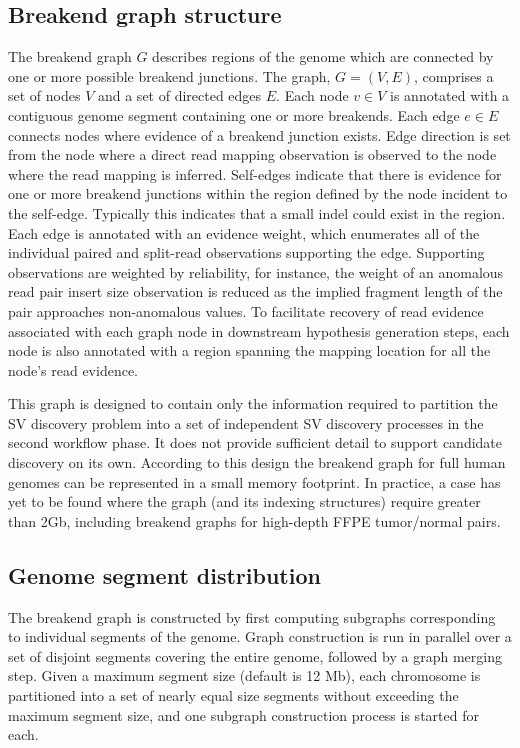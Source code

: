 \documentclass{article}
\begin{document}
\subsection{Breakend graph structure}

The breakend graph $G$ describes regions of the genome which are connected by one or more possible breakend junctions. The graph, $G = (V, E)$, comprises a set of nodes $V$ and a set of directed edges $E$. Each node $v \in V$ is annotated with a contiguous genome segment containing one or more breakends. Each edge $e \in E$ connects nodes where evidence of a breakend junction exists. Edge direction is set from the node where a direct read mapping observation is observed to the node where the read mapping is inferred. Self-edges indicate that there is evidence for one or more breakend junctions within the region defined by the node incident to the self-edge. Typically this indicates that a small indel could exist in the region. Each edge is annotated with an evidence weight, which enumerates all of the individual paired and split-read observations supporting the edge. Supporting observations are weighted by reliability, for instance, the weight of an anomalous read pair insert size observation is reduced as the implied fragment length of the pair approaches non-anomalous values. To facilitate recovery of read evidence associated with each graph node in downstream hypothesis generation steps, each node is also annotated with a region spanning the mapping location for all the node's read evidence.

This graph is designed to contain only the information required to partition the SV discovery problem into a set of independent SV discovery processes in the second workflow phase. It does not provide sufficient detail to support candidate discovery on its own. According to this design the breakend graph for full human genomes can be represented in a small memory footprint. In practice, a case has yet to be found where the graph (and its indexing structures) require greater than 2Gb, including breakend graphs for high-depth FFPE tumor/normal pairs.

\subsection{Genome segment distribution}

The breakend graph is constructed by first computing subgraphs corresponding to individual segments of the genome. Graph construction is run in parallel over a set of disjoint segments covering the entire genome, followed by a graph merging step. Given a maximum segment size (default is 12 Mb), each chromosome is partitioned into a set of nearly equal size segments without exceeding the maximum segment size, and one subgraph construction process is started for each.
\end{document}
